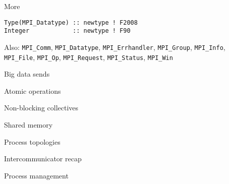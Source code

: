 \documentclass[11pt,headernav]{beamer}
\begin{document}
\begin{numberedframe}{More}
\begin{lstlisting}
Type(MPI_Datatype) :: newtype ! F2008
Integer            :: newtype ! F90
\end{lstlisting}

Also:
  \lstinline{MPI_Comm}, \lstinline{MPI_Datatype},
  \lstinline{MPI_Errhandler}, \lstinline{MPI_Group},
  \lstinline{MPI_Info}, \lstinline{MPI_File}, \lstinline{MPI_Op},
  \lstinline{MPI_Request}, \lstinline{MPI_Status}, \lstinline{MPI_Win}
\end{numberedframe}

\lstset{language=C}

 {Big data sends}


 {Atomic operations}

%
 
 {Non-blocking collectives}


 {Shared memory}


 {Process topologies}


 {Intercommunicator recap}





 {Process management}



\begin{comment}
  \begin{numberedframe}{Protocol}
    \label{sl:rendezvous}
    Communication is a `rendez-vous' or `hand-shake' protocol:
    \begin{itemize}
    \item Sender: `I have data for you'
    \item Receiver: `I have a buffer ready, send it over'
    \item Sender: `Ok, here it comes'
    \item Receiver: `Got it.'
    \end{itemize}
    Small messages bypass this: `eager' send.\\
    Definition of `small message' controlled by environment variables.
  \end{numberedframe}
\end{comment}

\begin{exerciseframe}[serialsend]
  \label{exserialsend}
  
\end{exerciseframe}

\begin{exerciseframe}[procgrid]
  \label{ex:rowcolcomm}
  
\end{exerciseframe}
\end{document}
